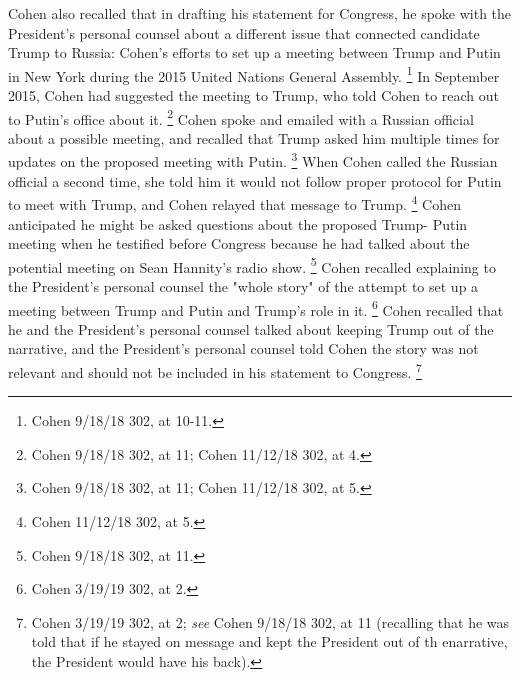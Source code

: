 {Cohen also recalled that in drafting his statement for Congress, he spoke with the President's personal counsel about a different issue that connected candidate Trump to Russia: Cohen's efforts to set up a meeting between Trump and Putin in New York during the 2015 United Nations General Assembly.%
\footnote{Cohen 9/18/18 302, at 10-11.}
In September 2015, Cohen had suggested the meeting to Trump, who told Cohen to reach out to Putin's office about it.%
\footnote{Cohen 9/18/18 302, at 11;
Cohen 11/12/18 302, at 4.}
Cohen spoke and emailed with a Russian official about a possible meeting, and recalled that Trump asked him multiple times for updates on the proposed meeting with Putin.%
\footnote{Cohen 9/18/18 302, at 11;
Cohen 11/12/18 302, at 5.}
When Cohen called the Russian official a second time, she told him it would not follow proper protocol for Putin to meet with Trump, and Cohen relayed that message to Trump.%
\footnote{Cohen 11/12/18 302, at 5.}
Cohen anticipated he might be asked questions about the proposed Trump- Putin meeting when he testified before Congress because he had talked about the potential meeting on Sean Hannity's radio show.%
\footnote{Cohen 9/18/18 302, at 11.}
Cohen recalled explaining to the President's personal counsel the "whole story" of the attempt to set up a meeting between Trump and Putin and Trump's role in it.%
\footnote{Cohen 3/19/19 302, at 2.}
Cohen recalled that he and the President's personal counsel talked about keeping Trump out of the narrative, and the President's personal counsel told Cohen the story was not relevant and should not be included in his statement to Congress.%
\footnote{Cohen 3/19/19 302, at 2;
\textit{see} Cohen 9/18/18 302, at 11 (recalling that he was told that if he stayed on message and kept the President out of th enarrative, the President would have his back).}

}

